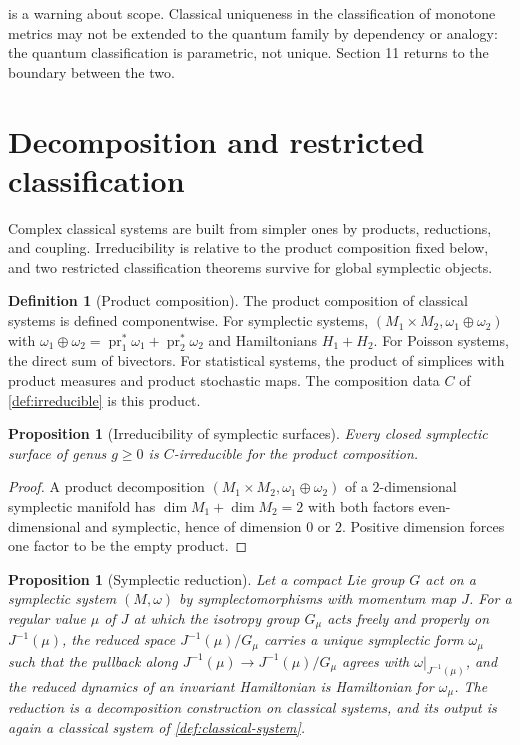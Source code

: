 \documentclass[11pt,letterpaper]{article}
\newtheorem{proposition}[theorem]{Proposition}
\theoremstyle{definition}
\newtheorem{definition}[theorem]{Definition}
\theoremstyle{remark}
\begin{document}
 is a warning about scope. Classical uniqueness in the classification of monotone metrics may not be extended to the quantum family by dependency or analogy: the quantum classification is parametric, not unique. Section 11 returns to the boundary between the two.

\section{Decomposition and restricted classification}

Complex classical systems are built from simpler ones by products, reductions, and coupling. Irreducibility is relative to the product composition fixed below, and two restricted classification theorems survive for global symplectic objects.

\begin{definition}[Product composition]
\label{def:product-composition}
The product composition of classical systems is defined componentwise. For symplectic systems, $(M_1 \times M_2, \omega_1 \oplus \omega_2)$ with $\omega_1 \oplus \omega_2 = \operatorname{pr}_1^{*} \omega_1 + \operatorname{pr}_2^{*} \omega_2$ and Hamiltonians $H_1 + H_2$. For Poisson systems, the direct sum of bivectors. For statistical systems, the product of simplices with product measures and product stochastic maps. The composition data $C$ of \cref{def:irreducible} is this product.
\end{definition}

\begin{proposition}[Irreducibility of symplectic surfaces]
\label{prop:surface-irreducible}
Every closed symplectic surface of genus $g \geq 0$ is $C$-irreducible for the product composition.
\end{proposition}

\begin{proof}
A product decomposition $(M_1 \times M_2, \omega_1 \oplus \omega_2)$ of a $2$-dimensional symplectic manifold has $\dim M_1 + \dim M_2 = 2$ with both factors even-dimensional and symplectic, hence of dimension $0$ or $2$. Positive dimension forces one factor to be the empty product.
\end{proof}

\begin{proposition}[Symplectic reduction]
\label{prop:reduction}
Let a compact Lie group $G$ act on a symplectic system $(M, \omega)$ by symplectomorphisms with momentum map $J$. For a regular value $\mu$ of $J$ at which the isotropy group $G_{\mu}$ acts freely and properly on $J^{-1}(\mu)$, the reduced space $J^{-1}(\mu) / G_{\mu}$ carries a unique symplectic form $\omega_{\mu}$ such that the pullback along $J^{-1}(\mu) \to J^{-1}(\mu)/G_{\mu}$ agrees with $\omega|_{J^{-1}(\mu)}$, and the reduced dynamics of an invariant Hamiltonian is Hamiltonian for $\omega_{\mu}$. The reduction is a decomposition construction on classical systems, and its output is again a classical system of \cref{def:classical-system}.
\end{proposition}
\end{document}
